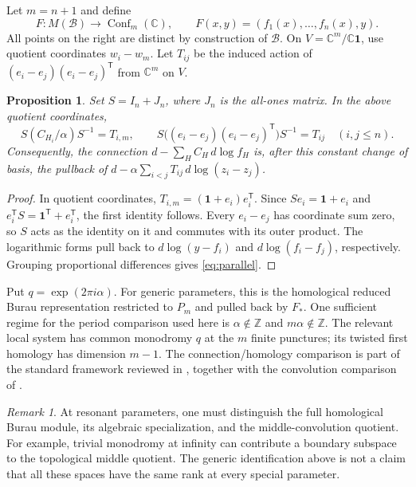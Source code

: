 \documentclass[11pt,a4paper]{article}
\newtheorem{proposition}[theorem]{Proposition}
\theoremstyle{remark}\newtheorem{remark}[theorem]{Remark}
\newcommand{\C}{\mathbb C}
\newcommand{\B}{\mathcal B}
\newcommand{\one}{\mathbf 1}
\newcommand{\Conf}{\operatorname{Conf}}
\begin{document}
Let $m=n+1$ and define
\begin{equation}\label{eq:F}
F:M(\B)\longrightarrow\Conf_m(\C),\qquad
F(x,y)=(f_1(x),\ldots,f_n(x),y).
\end{equation}
All points on the right are distinct by construction of $\B$.
On $V=\C^m/\C\one$, use quotient coordinates $w_i-w_m$.
Let $T_{ij}$ be the induced action of
$(e_i-e_j)(e_i-e_j)^{\mathsf T}$ from $\C^m$ on $V$.

\begin{proposition}\label{prop:gauge}
Set $S=I_n+J_n$, where $J_n$ is the all-ones matrix.  In the above
quotient coordinates,
\[
S(C_{H_i}/\alpha)S^{-1}=T_{i,m},\qquad
S\bigl((e_i-e_j)(e_i-e_j)^{\mathsf T}\bigr)S^{-1}=T_{ij}
\quad(i,j\le n).
\]
Consequently, the connection $d-\sum_H C_H\,d\log f_H$ is, after
this constant change of basis, the pullback of
$d-\alpha\sum_{i<j}T_{ij}\,d\log(z_i-z_j)$.
\end{proposition}
\begin{proof}
In quotient coordinates, $T_{i,m}=(\one+e_i)e_i^{\mathsf T}$.
Since $S e_i=\one+e_i$ and $e_i^{\mathsf T}S=\one^{\mathsf T}+e_i^{\mathsf T}$,
the first identity follows.  Every $e_i-e_j$ has coordinate sum zero,
so $S$ acts as the identity on it and commutes with its outer product.
The logarithmic forms pull back to $d\log(y-f_i)$ and
$d\log(f_i-f_j)$, respectively.  Grouping proportional differences
gives \eqref{eq:parallel}.
\end{proof}

Put $q=\exp(2\pi i\alpha)$.  For generic parameters, this is the
homological reduced Burau representation restricted to $P_m$ and pulled
back by $F_*$.  One sufficient regime for the period comparison used here
is $\alpha\notin\mathbb Z$ and $m\alpha\notin\mathbb Z$.
The relevant local system has common monodromy $q$ at the $m$ finite
punctures; its twisted first homology has dimension $m-1$.
The connection/homology comparison is part of the standard framework
reviewed in \cite[\S3]{Kohno}, together with the convolution comparison
of \cite[Theorem 4.2]{AH}.

\begin{remark}
At resonant parameters, one must distinguish the full homological Burau
module, its algebraic specialization, and the middle-convolution quotient.
For example, trivial monodromy at infinity can contribute a boundary
subspace to the topological middle quotient.  The generic identification
above is not a claim that all these spaces have the same rank at every
special parameter.
\end{remark}
\end{document}
